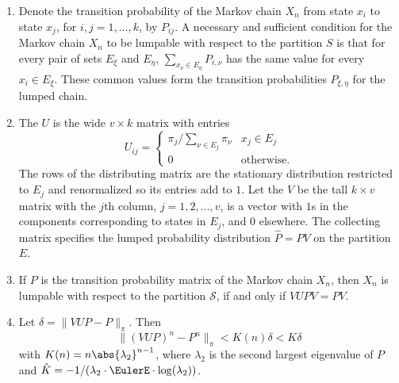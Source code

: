 \documentclass[12pt]{article}
\begin{document}
\begin{enumerate}
    \item
        Denote the transition probability of the Markov chain \( X_n \)
        from state \( x_i \) to state \( x_j \), for \( i, j = 1, \dots,
        k \), by \( P_{ij} \).  A necessary and sufficient condition for
        the Markov chain \( X_n \) to be lumpable with respect to the
        partition \( S \) is that for every pair of sets \( E_{\xi} \)
        and \( E_{\eta} \), \( \sum_{x_{\nu} \in E_{\eta}} P_{i,\nu} \)
        has the same value for every \( x_i \in E_{\xi} \).  These
        common values form the transition probabilities \( P_{\xi, \eta}
        \) for the lumped chain.
    \item
        The %
        \( U \) is the wide \( v \times k \) matrix with entries
        \[
            U_{ij} =
            \begin{cases}
                \pi_j/\sum_{\nu \in E_j} \pi_\nu & x_j \in E_j \\
                0 & \text{otherwise}.
            \end{cases}
        \] The rows of the distributing matrix are the stationary
        distribution restricted to \( E_j \) and renormalized so its
        entries add to \( 1 \).  Let the %
        \( V \) be the tall \( k \times v \) matrix with the \( j \)th
        column, \( j = 1, 2, \dots, v \), is a vector with \( 1 \)s in
        the components corresponding to states in \( E_j \), and \( 0 \)
        elsewhere.  The collecting matrix specifies the lumped
        probability distribution \( \hat{P} = P V \) on the partition \(
        E \).
    \item
        If \( P \) is the transition probability matrix of the Markov
        chain \( X_n \), then \( X_n \) is lumpable with respect to the
        partition \( \mathcal{S} \), if and only if \( VUPV = PV \).
    \item
        Let \( \delta = \| VUP - P \|_{\pi} \).  Then
        \[
            \| (VUP)^n - P^n \|_{\pi} < K(n) \delta < {K} \delta
        \] with \( K(n) = n \abs{\lambda_2}^{n-1} \), where \( \lambda_2
        \) is the second largest eigenvalue of \( P \) and \( \hat{K} =
        -1/(\lambda_2 \cdot \EulerE \cdot \log(\lambda_2)) \).
\end{enumerate}

\hr
\end{document}
